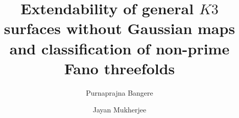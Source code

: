 \documentclass[11pt,twoside]{amsart}
\theoremstyle{plain}
\numberwithin{equation}{section}
\theoremstyle{definition}
\begin{document}
\title[Extendability of general $K3$ surfaces without Gaussian maps ]{Extendability of general $K3$ surfaces without Gaussian maps and classification of non-prime Fano threefolds}


\author[P. Bangere]{Purnaprajna Bangere}
\address{Department of Mathematics, University of Kansas, Lawrence, USA}


\author[J. Mukherjee]{Jayan Mukherjee}
\address{Department of Mathematics, Oklahoma State University, Stillwater, USA}



\end{document}

